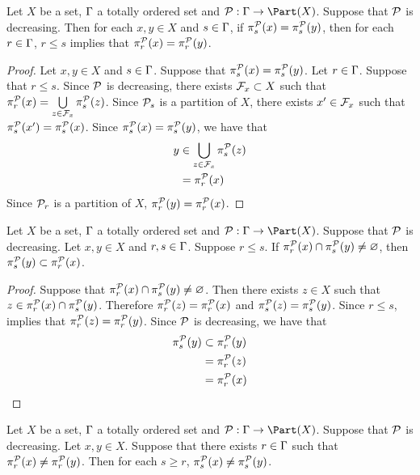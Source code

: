 \documentclass{book}
\begin{document}
\begin{ex}
	Let $X$ be a set, $\Gamma$ a totally ordered set and $\MP: \Gam \rightarrow \Part(X)$. Suppose that $\mathcal{P}$ is decreasing. Then for each $x,y \in X$ and $s \in \Gamma$, if $\pi^{\mathcal{P}}_s(x) = \pi^{\mathcal{P}}_s(y)$, then for each $r \in \Gamma$, $r \leq s$ implies that $\pi^{\mathcal{P}}_r(x) = \pi^{\mathcal{P}}_r(y)$.
\end{ex}

\begin{proof}
	Let $x,y \in X$ and $s \in \Gamma$. Suppose that $\pi^{\mathcal{P}}_s(x) = \pi^{\mathcal{P}}_s(y)$. Let $r \in \Gamma$. Suppose that $r \leq s$. Since $\mathcal{P}$ is decreasing, there exists $\mathcal{F}_x \subset X$ such that $\pi^{\mathcal{P}}_r(x) = \bigcup\limits_{z \in \mathcal{F}_x} \pi^{\mathcal{P}}_s(z)$. Since $\mathcal{P}_s$ is a partition of $X$,  there exists $x' \in \mathcal{F}_x$ such that $\pi^{\mathcal{P}}_s(x') = \pi^{\mathcal{P}}_s(x)$. Since $\pi^{\mathcal{P}}_s(x) = \pi^{\mathcal{P}}_s(y)$, we have that
	\begin{align*}
		y
		& \in \bigcup\limits_{z \in \mathcal{F}_x} \pi^{\mathcal{P}}_s(z) \\
		& = \pi^{\mathcal{P}}_r(x)
	\end{align*}
	Since $\mathcal{P}_r$ is a partition of $X$, $\pi^{\mathcal{P}}_r(y) = \pi^{\mathcal{P}}_r(x)$.
\end{proof}

\begin{ex}
	Let $X$ be a set, $\Gamma$ a totally ordered set and $\MP: \Gam \rightarrow \Part(X)$. Suppose that $\mathcal{P}$ is decreasing. Let $x, y \in X$ and $r,s \in \Gamma$. Suppose $r \leq s$. If $\pi^{\mathcal{P}}_r(x) \cap \pi^{\mathcal{P}}_s(y) \neq \varnothing$, then $\pi^{\mathcal{P}}_s(y) \subset \pi^{\mathcal{P}}_r(x)$.  
\end{ex}

\begin{proof}
	Suppose that $\pi^{\mathcal{P}}_r(x) \cap \pi^{\mathcal{P}}_s(y) \neq \varnothing$. Then there exists $z \in X$ such that $z \in \pi^{\mathcal{P}}_r(x) \cap \pi^{\mathcal{P}}_s(y)$. Therefore $\pi^{\mathcal{P}}_r(z) = \pi^{\mathcal{P}}_r(x)$ and $\pi^{\mathcal{P}}_s(z) = \pi^{\mathcal{P}}_s(y)$. Since $r \leq s$,  implies that $\pi^{\mathcal{P}}_r(z) = \pi^{\mathcal{P}}_r(y)$. Since $\mathcal{P}$ is decreasing, we have that
	\begin{align*}
		\pi^{\mathcal{P}}_s(y)
		& \subset \pi^{\mathcal{P}}_r(y) \\
		& = \pi^{\mathcal{P}}_r(z) \\
		& = \pi^{\mathcal{P}}_r(x) 
	\end{align*}
\end{proof}

\begin{ex}
	Let $X$ be a set, $\Gamma$ a totally ordered set and $\MP: \Gam \rightarrow \Part(X)$. Suppose that $\mathcal{P}$ is decreasing. Let $x,y \in X$. Suppose that there exists $r \in \Gamma$ such that $\pi^{\mathcal{P}}_r(x) \neq \pi^{\mathcal{P}}_r(y)$. Then for each $s \geq r$, $\pi^{\mathcal{P}}_s(x) \neq \pi^{\mathcal{P}}_s(y)$.
\end{ex}
\end{document}
